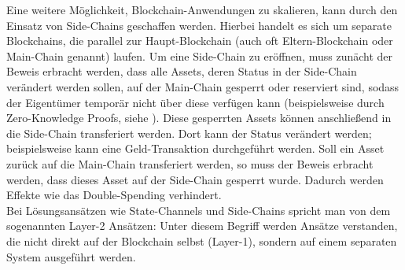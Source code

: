 Eine weitere Möglichkeit, Blockchain-Anwendungen zu skalieren, kann durch den Einsatz von Side-Chains \cite{sidechain2019} geschaffen werden. Hierbei handelt es sich um separate Blockchains, die parallel zur Haupt-Blockchain (auch oft Eltern-Blockchain oder Main-Chain genannt) laufen. Um eine Side-Chain zu eröffnen, muss zunächt der Beweis erbracht werden, dass alle Assets, deren Status in der Side-Chain verändert werden sollen, auf der Main-Chain gesperrt oder reserviert sind, sodass der Eigentümer temporär nicht über diese verfügen kann (beispielsweise durch Zero-Knowledge Proofs, siehe \cite{zeroknowledge2020}). Diese gesperrten Assets können anschließend in die Side-Chain transferiert werden. Dort kann der Status verändert werden; beispielsweise kann eine Geld-Transaktion durchgeführt werden. Soll ein Asset zurück auf die Main-Chain transferiert werden, so muss der Beweis erbracht werden, dass dieses Asset auf der Side-Chain gesperrt wurde. Dadurch werden Effekte wie das Double-Spending verhindert.\\
Bei Lösungsansätzen wie State-Channels und Side-Chains spricht man von dem sogenannten Layer-2 Ansätzen: Unter diesem Begriff werden Ansätze verstanden, die nicht direkt auf der Blockchain selbst (Layer-1), sondern auf einem separaten System ausgeführt werden.

